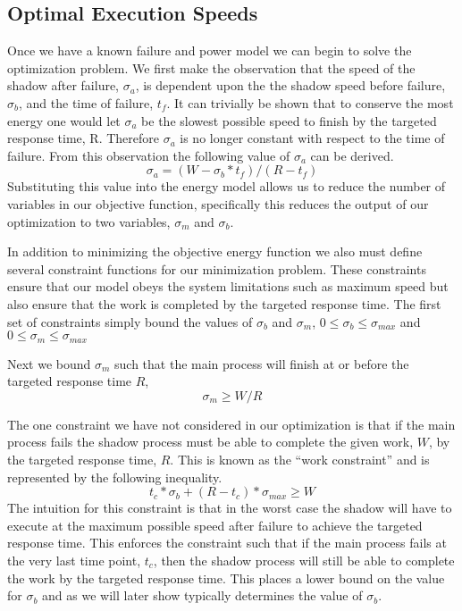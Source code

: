 \subsection{Optimal Execution Speeds}
\label{finding_execution_speeds}

Once we have a known failure and power model we can begin to solve the
optimization problem. We first make the observation that the speed of
the shadow after failure, $\sigma_a$, is dependent upon the the shadow
speed before failure, $\sigma_b$, and the time of failure, $t_f$. It
can trivially be shown that to conserve the most energy one would let
$\sigma_a$ be the slowest possible speed to finish by the targeted
response time, R. Therefore $\sigma_a$ is no longer constant with
respect to the time of failure. From this observation the following
value of $\sigma_a$ can be derived.
\begin{equation}
\label{optimal_sigma_a}
\sigma_a=(W-\sigma_b*t_f)/(R-t_f)
\end{equation}
Substituting this value into the energy model allows us to reduce the
number of variables in our objective function, specifically this
reduces the output of our optimization to two variables, $\sigma_m$
and $\sigma_b$.

In addition to minimizing the objective energy function we also must
define several constraint functions for our minimization
problem. These constraints ensure that our model obeys the system
limitations such as maximum speed but also ensure that the work is
completed by the targeted response time.  The first set of constraints
simply bound the values of $\sigma_b$ and $\sigma_m$,
$0\leq\sigma_b\leq\sigma_{max}$ and $0\leq\sigma_m\leq\sigma_{max}$


Next we bound $\sigma_m$ such that the main process will finish at or
before the targeted response time $R$, 
\begin{equation}
\sigma_m≥W/R
\end{equation}

The one constraint we have not considered in our optimization is that
if the main process fails the shadow process must be able to complete
the given work, $W$, by the targeted response time, $R$. This is known
as the ``work constraint'' and is represented by the following
inequality.
\begin{equation}
\label{work_constraint}
t_c*\sigma_b+(R-t_c)*\sigma_{max} \geq W 
\end{equation}
The intuition for this constraint is that in the worst case the shadow
will have to execute at the maximum possible speed after failure to
achieve the targeted response time. This enforces the constraint such
that if the main process fails at the very last time point, $t_c$,
then the shadow process will still be able to complete the work by the
targeted response time. This places a lower bound on the value for
$\sigma_b$ and as we will later show typically determines the value of
$\sigma_b$.

